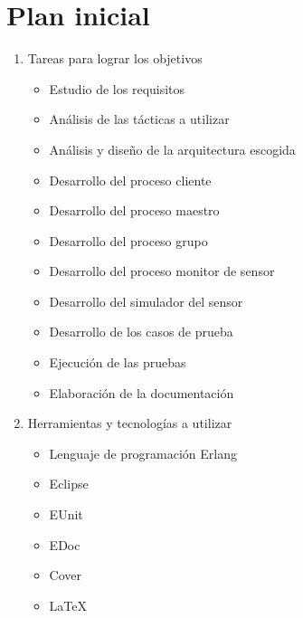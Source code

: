 \documentclass[a4paper,10pt]{article}
\begin{document}
  
\newpage

\section{Plan inicial}

\begin{enumerate}
  \item Tareas para lograr los objetivos
  \begin{itemize}
    \item Estudio de los requisitos
    \item Análisis de las tácticas a utilizar
    \item Análisis y diseño de la arquitectura escogida
    \item Desarrollo del proceso cliente
    \item Desarrollo del proceso maestro
    \item Desarrollo del proceso grupo
    \item Desarrollo del proceso monitor de sensor
    \item Desarrollo del simulador del sensor
    \item Desarrollo de los casos de prueba
    \item Ejecución de las pruebas
    \item Elaboración de la documentación
  \end{itemize}

  \item Herramientas y tecnologías a utilizar
  \begin{itemize}
    \item Lenguaje de programación Erlang
    \item Eclipse
    \item EUnit
    \item EDoc
    \item Cover
    \item LaTeX
  \end{itemize}


\end{enumerate}
\end{document}
